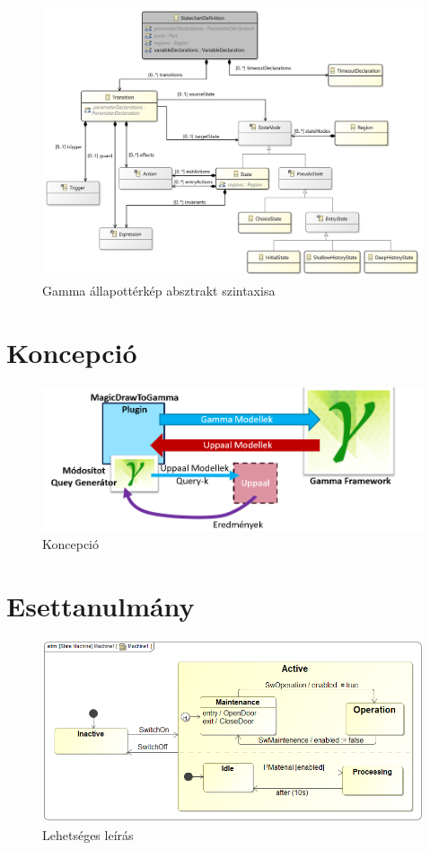 \begin{figure}[!ht]
	\centering
	\includegraphics[keepaspectratio, width=150mm]{figures/statechart_class_diagram.png}
	\caption{Gamma állapottérkép absztrakt szintaxisa}
\end{figure}

\clearpage\section{Koncepció}

\begin{figure}[!ht]
	\centering
	\includegraphics[keepaspectratio, width=150mm]{figures/concept.png}
	\caption{Koncepció}
\end{figure}

\section{Esettanulmány}

\begin{figure}[H]
	\centering
	\includegraphics[keepaspectratio, width=150mm]{figures/machine1.png}
	\caption{Lehetséges leírás}
\end{figure}

